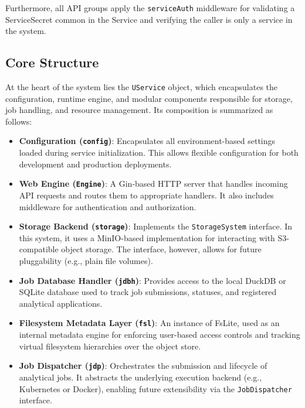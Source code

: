 Furthermore, all API groups apply the \texttt{serviceAuth} middleware for validating a ServiceSecret common in the Service and verifying the caller is only a service in the system.

\subsection{Core Structure}

At the heart of the system lies the \texttt{UService} object, which encapsulates the configuration, runtime engine, and modular components responsible for storage, job handling, and resource management. Its composition is summarized as follows:

\begin{itemize}
    \item \textbf{Configuration (\texttt{config})}: Encapsulates all environment-based settings loaded during service initialization. This allows flexible configuration for both development and production deployments.
    
    \item \textbf{Web Engine (\texttt{Engine})}: A Gin-based HTTP server that handles incoming API requests and routes them to appropriate handlers. It also includes middleware for authentication and authorization.
    
    \item \textbf{Storage Backend (\texttt{storage})}: Implements the \texttt{StorageSystem} interface. In this system, it uses a MinIO-based implementation for interacting with S3-compatible object storage. The interface, however, allows for future pluggability (e.g., plain file volumes).
    
    \item \textbf{Job Database Handler (\texttt{jdbh})}: Provides access to the local DuckDB or SQLite database used to track job submissions, statuses, and registered analytical applications.
    
    \item \textbf{Filesystem Metadata Layer (\texttt{fsl})}: An instance of FsLite, used as an internal metadata engine for enforcing user-based access controls and tracking virtual filesystem hierarchies over the object store.
    
    \item \textbf{Job Dispatcher (\texttt{jdp})}: Orchestrates the submission and lifecycle of analytical jobs. It abstracts the underlying execution backend (e.g., Kubernetes or Docker), enabling future extensibility via the \texttt{JobDispatcher} interface.
\end{itemize}


